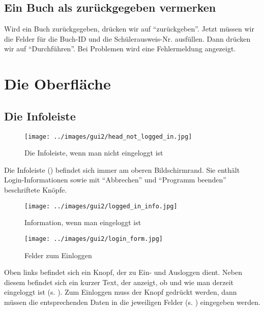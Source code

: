 
\subsection{Ein Buch als zurückgegeben vermerken}
\label{subsec:quickstart:restitute}
Wird ein Buch zurückgegeben, drücken wir auf ``zurückgeben''. Jetzt müssen wir die Felder für die Buch-ID und die Schülerausweis-Nr. ausfüllen.
Dann drücken wir auf ``Durchführen''. Bei Problemen wird eine Fehlermeldung angezeigt.


\section{Die Oberfläche}
\label{sec:interface}
\subsection{Die Infoleiste}
\label{subsec:interface:header}
\begin{figure}\texttt{[image: ../images/gui2/head\_not\_logged\_in.jpg]}\caption{Die Infoleiste, wenn man nicht eingeloggt ist}\label{fig:head_not_logged_in}\end{figure}

Die Infoleiste () befindet sich immer am oberen Bildschirmrand.
Sie enthält Login-Informationen sowie mit ``Abbrechen'' und ``Programm beenden'' beschriftete Knöpfe.

\begin{figure}\texttt{[image: ../images/gui2/logged\_in\_info.jpg]}\caption{Information, wenn man eingeloggt ist}\label{fig:logged_in_info}\end{figure}
\begin{figure}\texttt{[image: ../images/gui2/login\_form.jpg]}\caption{Felder zum Einloggen}\label{fig:login_form}\end{figure}

Oben links befindet sich ein Knopf, der zu Ein- und Ausloggen dient.
Neben diesem befindet sich ein kurzer Text, der anzeigt, ob und wie man derzeit eingeloggt ist (s. ). 
Zum Einloggen muss der Knopf gedrückt werden, dann müssen die entsprechenden Daten in die jeweiligen Felder (s. ) eingegeben werden.

